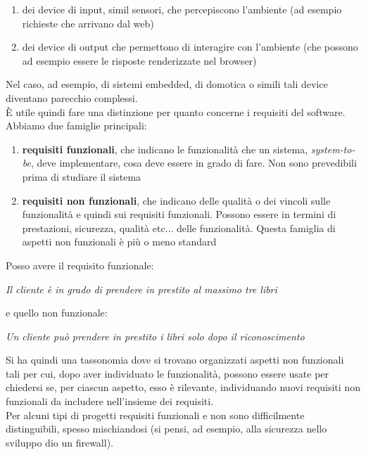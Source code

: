 \documentclass[a4paper,12pt, oneside]{book}
\begin{document}
\begin{enumerate}
  \item dei device di input, simil sensori, che percepiscono l'ambiente (ad
  esempio richieste che arrivano dal web)
  \item dei device di output che permettono di interagire con l'ambiente (che
  possono ad esempio essere le risposte renderizzate nel browser)
\end{enumerate}
Nel caso, ad esempio, di sistemi embedded, di domotica o simili tali device
diventano parecchio complessi.\\
È utile quindi fare una distinzione per quanto concerne i requisiti del
software. Abbiamo due famiglie principali:
\begin{enumerate}
  \item \textbf{requisiti funzionali}, che indicano le funzionalità che un
  sistema, \textit{system-to-be}, deve implementare, cosa deve essere in grado
  di fare. Non sono prevedibili prima di studiare il sistema
  \item \textbf{requisiti non funzionali}, che indicano delle qualità o dei
  vincoli sulle funzionalità e quindi sui requisiti funzionali. Possono essere
  in termini di prestazioni, sicurezza, qualità etc$\ldots$ delle
  funzionalità. Questa famiglia di aspetti non funzionali è più o meno standard
\end{enumerate}
\begin{esempio}
  Posso avere il requisito funzionale:
  \begin{center}
    \textit{Il cliente è in grado di prendere in prestito al massimo tre libri}
  \end{center}
  e quello non funzionale:
  \begin{center}
    \textit{Un cliente può prendere in prestito i libri solo dopo il
      riconoscimento}  
  \end{center}
\end{esempio}
Si ha quindi una tassonomia dove si trovano organizzati aspetti non funzionali
tali per cui, dopo aver individuato le funzionalità, possono essere usate per
chiedersi se, per ciascun aspetto, esso è rilevante, individuando nuovi requisiti
non funzionali da includere nell'insieme dei requisiti.\\
Per alcuni tipi di progetti requisiti funzionali e non sono difficilmente
distinguibili, spesso mischiandosi (si pensi, ad esempio, alla sicurezza nello
sviluppo dio un firewall).
\end{document}
